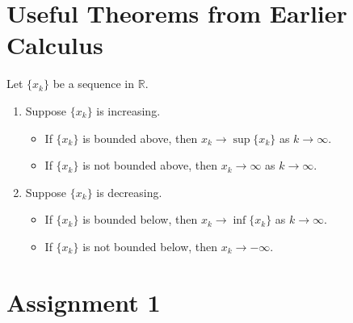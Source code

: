 \documentclass[notoc,notitlepage]{tufte-book}
\begin{document}



\appendix

\chapter{Useful Theorems from Earlier Calculus}%
\label{chp:useful_theorems_from_earlier_calculus}

\begin{thm}\label{thm:monotone_convergence_theorem}
  Let $\{x_k\}$ be a sequence in $\mathbb{R}$.
  \begin{enumerate}
    \item Suppose $\{x_k\}$ is increasing.
      \begin{itemize}
        \item If $\{ x_k \}$ is bounded above, then $x_k \to \sup \{ x_k \}$ as $k \to \infty$.
        \item If $\{ x_k \}$ is not bounded above, then $x_k \to \infty$ as $k \to \infty$.
      \end{itemize}
    \item Suppose $\{ x_k \}$ is decreasing.
      \begin{itemize}
        \item If $\{ x_k \}$ is bounded below, then $x_k \to \inf \{ x_k \}$ as $k \to \infty$.
        \item If $\{ x_k \}$ is not bounded below, then $x_k \to -\infty$.
      \end{itemize}
  \end{enumerate}
\end{thm}

\chapter{Assignment 1}%
\label{chp:assignment_1}
\end{document}

